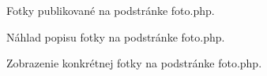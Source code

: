 \begin{figure}[!tbh]
\centering
\setlength{\fboxsep}{0pt}%
\setlength{\fboxrule}{1pt}%
\caption{Fotky publikované na podstránke foto.php.}\label{OBRAZOK 1.4}
\end{figure}

\begin{figure}[!tbh]
\centering
\setlength{\fboxsep}{0pt}%
\setlength{\fboxrule}{1pt}%
\caption{Náhlad popisu fotky na podstránke foto.php.}\label{OBRAZOK 1.5}
\end{figure}

\begin{figure}[!tbh]
\centering
\setlength{\fboxsep}{0pt}%
\setlength{\fboxrule}{1pt}%
\caption{Zobrazenie konkrétnej fotky na podstránke foto.php.}\label{OBRAZOK 1.6}
\end{figure}


